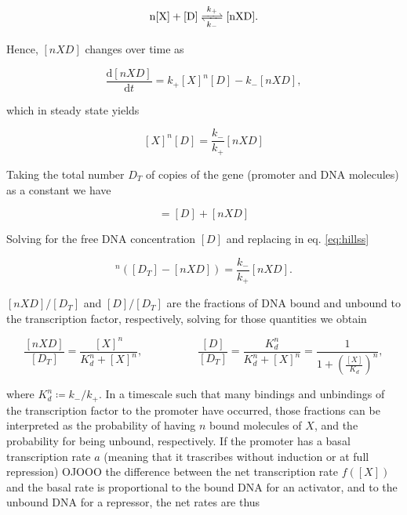 \begin{equation*}
  \ce{n[X] + [D]} \ce{<=>[k_+][k_-]} \ce{[nXD]}.
\end{equation*}

Hence, $[nXD]$ changes over time as

\begin{equation*}
  \frac{\mathrm{d}[nXD]}{\mathrm{d}t} = k_+[X]^n[D] - k_-[nXD],
\end{equation*}

which in steady state yields

\begin{equation}
  \label{eq:hillss}
  [X]^n[D] = \frac{k_-}{k_+}[nXD]
\end{equation}

Taking the total number $D_T$ of copies of the gene (promoter and DNA molecules) as a constant we have

\begin{equation*}
  [D_T] = [D]+[nXD]
\end{equation*}

Solving for the free DNA concentration $[D]$ and replacing in eq. \eqref{eq:hillss}

\begin{equation*}
  [X]^n\left([D_T]-[nXD]\right) = \frac{k_-}{k_+}[nXD].
\end{equation*}

$[nXD]/[D_T]$ and $[D]/[D_T]$ are the fractions of DNA bound and unbound to the transcription factor, respectively, solving for those quantities we obtain

\begin{equation*}
  \frac{[nXD]}{[D_T]} = \frac{[X]^n}{K_d^n+[X]^n}, \quad\quad\quad\quad\quad  \frac{[D]}{[D_T]} = \frac{K_d^n}{K_d^n+[X]^n} = \frac{1}{1+\left(\frac{[X]}{K_d}\right)^n},
\end{equation*}

where $K_d^n \coloneqq k_-/k_+$. In a timescale such that many bindings and unbindings of the transcription factor to the promoter have occurred, those fractions can be interpreted as the probability of having $n$ bound molecules of $X$, and the probability for being unbound, respectively. If the promoter has a basal transcription rate $a$ (meaning that it trascribes without induction or at full repression) OJOOO the difference between the net transcription rate $f([X])$ and the basal rate is proportional to the bound DNA for an activator, and to the unbound DNA for a repressor, the net rates are thus

